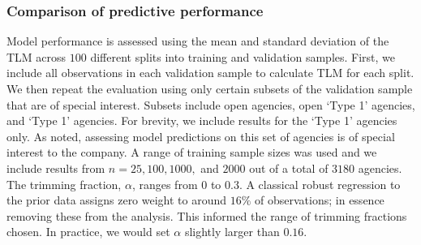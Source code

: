 \documentclass[11pt]{article}
\begin{document}
\subsubsection{Comparison of predictive performance}
Model performance is assessed
using the mean and standard deviation of the TLM 
across $100$ different splits into training and validation samples. First, we include all observations
in each validation sample to calculate TLM for each split. We then
repeat the evaluation using only certain subsets of the validation
sample that are of special interest. Subsets include open agencies,
open `Type 1' agencies, and `Type 1' agencies. For brevity, we include
results for the `Type 1' agencies only. As noted, assessing model
predictions on this set of agencies is of special interest to the
company.  A range of training sample sizes was used and we include
results from $n=25,100,1000,$ and $2000$ out of a total of $3180$ agencies. The trimming fraction, $\alpha$, ranges from $0$ to $0.3$. A classical robust regression to the prior data assigns zero weight to around $16\%$ of observations; in essence removing these from the analysis. This informed the range of trimming fractions chosen.  
In practice, we would set $\alpha$ slightly larger than $0.16$.  


%
\end{document}
